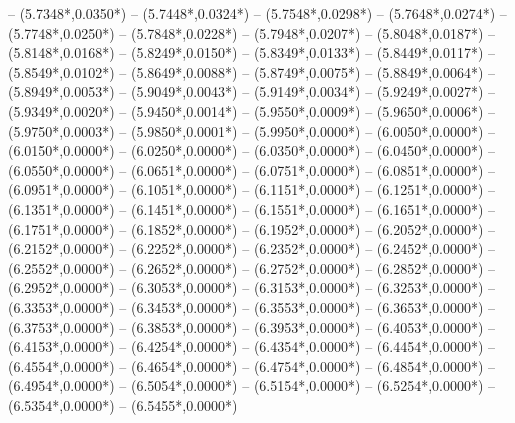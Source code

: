 {	-- ({5.7348*\dx},{0.0350*\dy})
	-- ({5.7448*\dx},{0.0324*\dy})
	-- ({5.7548*\dx},{0.0298*\dy})
	-- ({5.7648*\dx},{0.0274*\dy})
	-- ({5.7748*\dx},{0.0250*\dy})
	-- ({5.7848*\dx},{0.0228*\dy})
	-- ({5.7948*\dx},{0.0207*\dy})
	-- ({5.8048*\dx},{0.0187*\dy})
	-- ({5.8148*\dx},{0.0168*\dy})
	-- ({5.8249*\dx},{0.0150*\dy})
	-- ({5.8349*\dx},{0.0133*\dy})
	-- ({5.8449*\dx},{0.0117*\dy})
	-- ({5.8549*\dx},{0.0102*\dy})
	-- ({5.8649*\dx},{0.0088*\dy})
	-- ({5.8749*\dx},{0.0075*\dy})
	-- ({5.8849*\dx},{0.0064*\dy})
	-- ({5.8949*\dx},{0.0053*\dy})
	-- ({5.9049*\dx},{0.0043*\dy})
	-- ({5.9149*\dx},{0.0034*\dy})
	-- ({5.9249*\dx},{0.0027*\dy})
	-- ({5.9349*\dx},{0.0020*\dy})
	-- ({5.9450*\dx},{0.0014*\dy})
	-- ({5.9550*\dx},{0.0009*\dy})
	-- ({5.9650*\dx},{0.0006*\dy})
	-- ({5.9750*\dx},{0.0003*\dy})
	-- ({5.9850*\dx},{0.0001*\dy})
	-- ({5.9950*\dx},{0.0000*\dy})
	-- ({6.0050*\dx},{0.0000*\dy})
	-- ({6.0150*\dx},{0.0000*\dy})
	-- ({6.0250*\dx},{0.0000*\dy})
	-- ({6.0350*\dx},{0.0000*\dy})
	-- ({6.0450*\dx},{0.0000*\dy})
	-- ({6.0550*\dx},{0.0000*\dy})
	-- ({6.0651*\dx},{0.0000*\dy})
	-- ({6.0751*\dx},{0.0000*\dy})
	-- ({6.0851*\dx},{0.0000*\dy})
	-- ({6.0951*\dx},{0.0000*\dy})
	-- ({6.1051*\dx},{0.0000*\dy})
	-- ({6.1151*\dx},{0.0000*\dy})
	-- ({6.1251*\dx},{0.0000*\dy})
	-- ({6.1351*\dx},{0.0000*\dy})
	-- ({6.1451*\dx},{0.0000*\dy})
	-- ({6.1551*\dx},{0.0000*\dy})
	-- ({6.1651*\dx},{0.0000*\dy})
	-- ({6.1751*\dx},{0.0000*\dy})
	-- ({6.1852*\dx},{0.0000*\dy})
	-- ({6.1952*\dx},{0.0000*\dy})
	-- ({6.2052*\dx},{0.0000*\dy})
	-- ({6.2152*\dx},{0.0000*\dy})
	-- ({6.2252*\dx},{0.0000*\dy})
	-- ({6.2352*\dx},{0.0000*\dy})
	-- ({6.2452*\dx},{0.0000*\dy})
	-- ({6.2552*\dx},{0.0000*\dy})
	-- ({6.2652*\dx},{0.0000*\dy})
	-- ({6.2752*\dx},{0.0000*\dy})
	-- ({6.2852*\dx},{0.0000*\dy})
	-- ({6.2952*\dx},{0.0000*\dy})
	-- ({6.3053*\dx},{0.0000*\dy})
	-- ({6.3153*\dx},{0.0000*\dy})
	-- ({6.3253*\dx},{0.0000*\dy})
	-- ({6.3353*\dx},{0.0000*\dy})
	-- ({6.3453*\dx},{0.0000*\dy})
	-- ({6.3553*\dx},{0.0000*\dy})
	-- ({6.3653*\dx},{0.0000*\dy})
	-- ({6.3753*\dx},{0.0000*\dy})
	-- ({6.3853*\dx},{0.0000*\dy})
	-- ({6.3953*\dx},{0.0000*\dy})
	-- ({6.4053*\dx},{0.0000*\dy})
	-- ({6.4153*\dx},{0.0000*\dy})
	-- ({6.4254*\dx},{0.0000*\dy})
	-- ({6.4354*\dx},{0.0000*\dy})
	-- ({6.4454*\dx},{0.0000*\dy})
	-- ({6.4554*\dx},{0.0000*\dy})
	-- ({6.4654*\dx},{0.0000*\dy})
	-- ({6.4754*\dx},{0.0000*\dy})
	-- ({6.4854*\dx},{0.0000*\dy})
	-- ({6.4954*\dx},{0.0000*\dy})
	-- ({6.5054*\dx},{0.0000*\dy})
	-- ({6.5154*\dx},{0.0000*\dy})
	-- ({6.5254*\dx},{0.0000*\dy})
	-- ({6.5354*\dx},{0.0000*\dy})
	-- ({6.5455*\dx},{0.0000*\dy})
}

